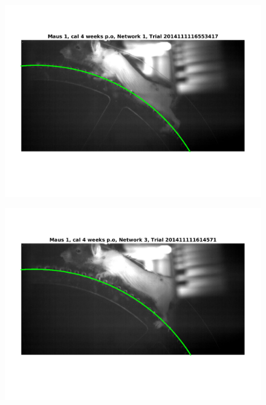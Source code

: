 \documentclass[
	fontsize=12pt,
	paper=a4,
	twoside=false,
	numbers=noenddot,
	plainheadsepline,
	toc=listof,
	toc=bibliography
]{scrartcl}
\begin{document}
\begin{figure} [htb] \centering
	\includegraphics[scale = 0.6]{images/mouse1/result_Maus_1_cal_4_weeks_Network_1.png}
\end{figure}
\begin{figure} [htb] \centering
	\includegraphics[scale = 0.6]{images/mouse1/result_Maus_1_cal_4_weeks_Network_3.png}
\end{figure}
\end{document}
